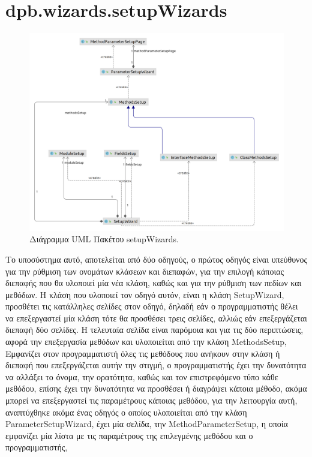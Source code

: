 \section{dpb.wizards.setupWizards}
\label{sec:dpb.wizards.setupWizards}
\begin{figure}[H]
    \centering
    \includegraphics[width=1.0\textwidth]{Figures/setupWizard.png}
    \caption{Διάγραμμα UML Πακέτου setupWizards.}
    \label{fig:setupWizardUML}
\end{figure}
Το υποσύστημα αυτό, αποτελείται από δύο οδηγούς, ο πρώτος οδηγός είναι υπεύθυνος για την ρύθμιση των ονομάτων κλάσεων και διεπαφών, 
για την επιλογή κάποιας διεπαφής που θα υλοποιεί μία νέα κλάση, καθώς και για την ρύθμιση των πεδίων και μεθόδων. 
Η κλάση που υλοποιεί τον οδηγό αυτόν, είναι η κλάση SetupWizard, προσθέτει τις κατάλληλες σελίδες στον οδηγό, δηλαδή εάν ο προγραμματιστής 
θέλει να επεξεργαστεί μία κλάση τότε θα προσθέσει τρεις σελίδες, αλλιώς εάν επεξεργάζεται διεπαφή δύο σελίδες. 
Η τελευταία σελίδα είναι παρόμοια και για τις δύο περιπτώσεις, αφορά την επεξεργασία μεθόδων και υλοποιείται από την κλάση MethodsSetup,
Εμφανίζει στον προγραμματιστή όλες τις μεθόδους που ανήκουν στην κλάση ή διεπαφή που επεξεργάζεται αυτήν την στιγμή, 
ο προγραμματιστής έχει την δυνατότητα να αλλάξει το όνομα, την ορατότητα, καθώς και τον επιστρεφόμενο τύπο κάθε μεθόδου, 
επίσης έχει την δυνατότητα να προσθέσει ή διαγράψει κάποια μέθοδο, ακόμα μπορεί να επεξεργαστεί τις παραμέτρους κάποιας μεθόδου, 
για την λειτουργία αυτή, αναπτύχθηκε ακόμα ένας οδηγός ο οποίος υλοποιείται από την κλάση ParameterSetupWizard, 
έχει μία σελίδα, την MethodParameterSetup, η οποία εμφανίζει μία λίστα με τις παραμέτρους της επιλεγμένης μεθόδου και ο προγραμματιστής, 
